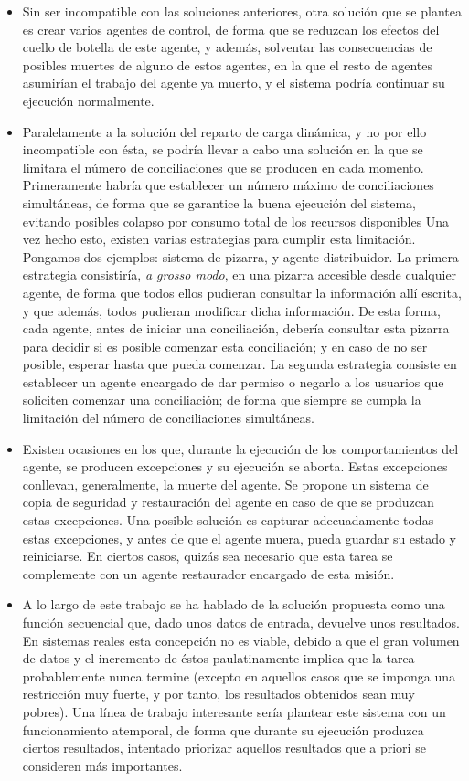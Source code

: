 \begin{itemize}
	\item Sin ser incompatible con las soluciones anteriores, otra solución que se plantea es crear varios agentes de control, de forma que se reduzcan los efectos del cuello de botella de este agente, y además, solventar las consecuencias de posibles muertes de alguno de estos agentes, en la que el resto de agentes asumirían el trabajo del agente ya muerto, y el sistema podría continuar su ejecución normalmente.

	\item Paralelamente a la solución del reparto de carga dinámica, y no por ello incompatible con ésta, se podría llevar a cabo una solución en la que se limitara el número de conciliaciones que se producen en cada momento. Primeramente habría que establecer un número máximo de conciliaciones simultáneas, de forma que se garantice la buena ejecución del sistema, evitando posibles colapso por consumo total de los recursos disponibles Una vez hecho esto, existen varias estrategias para cumplir esta limitación. Pongamos dos ejemplos: sistema de pizarra, y agente distribuidor. La primera estrategia consistiría, \emph{a grosso modo}, en una pizarra accesible desde cualquier agente, de forma que todos ellos pudieran consultar la información allí escrita, y que además, todos pudieran modificar dicha información. De esta forma, cada agente, antes de iniciar una conciliación, debería consultar esta pizarra para decidir si es posible comenzar esta conciliación; y en caso de no ser posible, esperar hasta que pueda comenzar. La segunda estrategia consiste en establecer un agente encargado de dar permiso o negarlo a los usuarios que soliciten comenzar una conciliación; de forma que siempre se cumpla la limitación del número de conciliaciones simultáneas.

	\item Existen ocasiones en los que, durante la ejecución de los comportamientos del agente, se producen excepciones y su ejecución se aborta. Estas excepciones conllevan, generalmente, la muerte del agente. Se propone un sistema de copia de seguridad y restauración del agente en caso de que se produzcan estas excepciones. Una posible solución es capturar adecuadamente todas estas excepciones, y antes de que el agente muera, pueda guardar su estado y reiniciarse. En ciertos casos, quizás sea necesario que esta tarea se complemente con un agente restaurador encargado de esta misión.

	\item A lo largo de este trabajo se ha hablado de la solución propuesta como una función secuencial que, dado unos datos de entrada, devuelve unos resultados. En sistemas reales esta concepción no es viable, debido a que el gran volumen de datos y el incremento de éstos paulatinamente implica que la tarea probablemente nunca termine (excepto en aquellos casos que se imponga una restricción muy fuerte, y por tanto, los resultados obtenidos sean muy pobres). Una línea de trabajo interesante sería plantear este sistema con un funcionamiento atemporal, de forma que durante su ejecución produzca ciertos resultados, intentado priorizar aquellos resultados que a priori se consideren más importantes.


\end{itemize}
